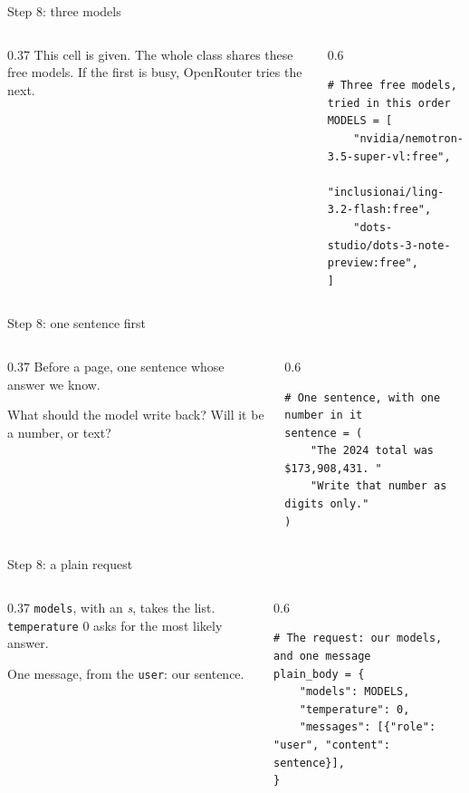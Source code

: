 \documentclass[9pt,aspectratio=169]{beamer}
\begin{document}
\begin{frame}[fragile]{Step 8: three models}
    \begin{columns}[T]
        \begin{column}{0.37\textwidth}
            This cell is given. The whole class shares these free models. If the first is busy, OpenRouter tries the next.
        \end{column}
        \begin{column}{0.6\textwidth}
\begin{lstlisting}
# Three free models, tried in this order
MODELS = [
    "nvidia/nemotron-3.5-super-vl:free",
    "inclusionai/ling-3.2-flash:free",
    "dots-studio/dots-3-note-preview:free",
]
\end{lstlisting}
        \end{column}
    \end{columns}
\end{frame}

\begin{frame}[fragile]{Step 8: one sentence first}
    \begin{columns}[T]
        \begin{column}{0.37\textwidth}
            Before a page, one sentence whose answer we know.

            \medskip
            What should the model write back? Will it be a number, or text?
        \end{column}
        \begin{column}{0.6\textwidth}
\begin{lstlisting}
# One sentence, with one number in it
sentence = (
    "The 2024 total was $173,908,431. "
    "Write that number as digits only."
)
\end{lstlisting}
        \end{column}
    \end{columns}
\end{frame}

\begin{frame}[fragile]{Step 8: a plain request}
    \begin{columns}[T]
        \begin{column}{0.37\textwidth}
            \texttt{models}, with an \textit{s}, takes the list. \texttt{temperature} 0 asks for the most likely answer.

            \medskip
            One message, from the \texttt{user}: our sentence.
        \end{column}
        \begin{column}{0.6\textwidth}
\begin{lstlisting}
# The request: our models, and one message
plain_body = {
    "models": MODELS,
    "temperature": 0,
    "messages": [{"role": "user", "content": sentence}],
}
\end{lstlisting}
        \end{column}
    \end{columns}
\end{frame}
\end{document}
